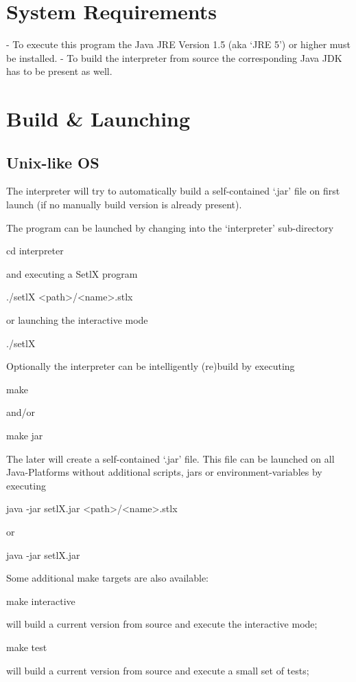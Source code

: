 \section{System Requirements}
    - To execute this program the Java JRE Version 1.5 (aka `JRE 5') or higher
      must be installed.
    - To build the interpreter from source the corresponding Java JDK has to be
      present as well.

\section{Build \& Launching}

\subsection{Unix-like OS}
    The interpreter will try to automatically build a self-contained `.jar' file
    on first launch (if no manually build version is already present).

    The program can be launched by changing into the `interpreter' sub-directory

        cd interpreter

    and executing a SetlX program

        ./setlX <path>/<name>.stlx

    or launching the interactive mode

        ./setlX


    Optionally the interpreter can be intelligently (re)build by executing

        make

    and/or

        make jar

    The later will create a self-contained `.jar' file. This file can be
    launched on all Java-Platforms without additional scripts, jars or
    environment-variables by executing

        java -jar setlX.jar <path>/<name>.stlx

    or

        java -jar setlX.jar


    Some additional make targets are also available:

        make interactive

    will build a current version from source and execute the interactive mode;

        make test

    will build a current version from source and execute a small set of tests;

